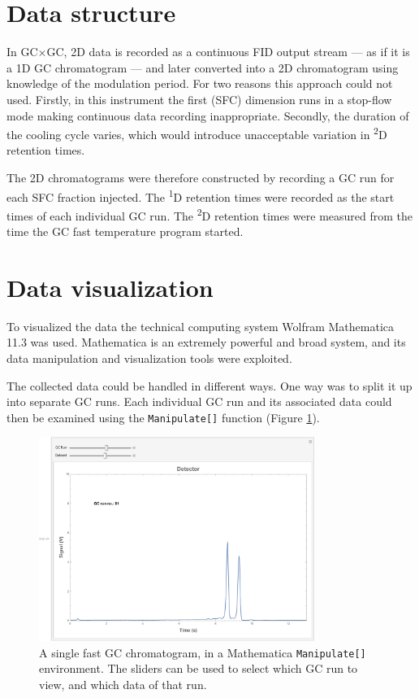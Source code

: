 \section{Data structure}

In GC×GC, 2D data is recorded as a continuous FID output stream --- as if it is
a 1D GC chromatogram --- and later converted into a 2D chromatogram using
knowledge of the modulation period. For two reasons this approach could not
used. Firstly, in this instrument the first (SFC) dimension runs in a stop-flow
mode making continuous data recording inappropriate. Secondly, the duration of
the cooling cycle varies, which would introduce unacceptable variation in
\textsuperscript{2}D retention times.

The 2D chromatograms were therefore constructed by recording a GC run for each
SFC fraction injected. The \textsuperscript{1}D retention times were recorded as
the start times of each individual GC run. The \textsuperscript{2}D retention
times were measured from the time the GC fast temperature program started.

\section{Data visualization}
To visualized the data the technical computing system Wolfram Mathematica
11.3\texttrademark{} was used. Mathematica is an extremely powerful and broad
system, and its data manipulation and visualization tools were exploited.

The collected data could be handled in different ways. One way was to split it
up into separate GC runs. Each individual GC run and its associated data could
then be examined using the \texttt{Manipulate[]} function (Figure
\ref{fig:SingleGC}).

\begin{figure}
	\centering
	\includegraphics[width=0.8\textwidth]{Figures/Manipulate.pdf}
	\decoRule
	
	\caption[A single fast GC chromatogram ]{A single fast GC chromatogram, in a
	Mathematica \texttt{Manipulate[]} environment. The sliders can be used to select
	which GC run to view, and which data of that run. }
	
	\label{fig:SingleGC}
\end{figure}

